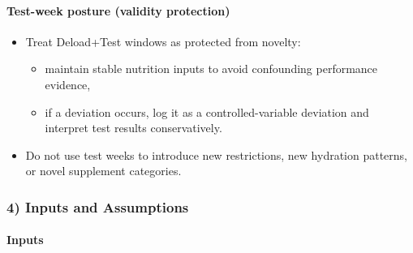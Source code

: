\documentclass[10pt]{article}
\begin{document}
\paragraph*{Test-week posture (validity protection)}

\begin{itemize}
\item Treat Deload+Test windows as protected from novelty:
  \begin{itemize}
  \item maintain stable nutrition inputs to avoid confounding performance evidence,
  \item if a deviation occurs, log it as a controlled-variable deviation and interpret test results conservatively.
  \end{itemize}
\item Do not use test weeks to introduce new restrictions, new hydration patterns, or novel supplement categories.
\end{itemize}

\subsubsection*{4) Inputs and Assumptions}

\paragraph*{Inputs}
\end{document}
